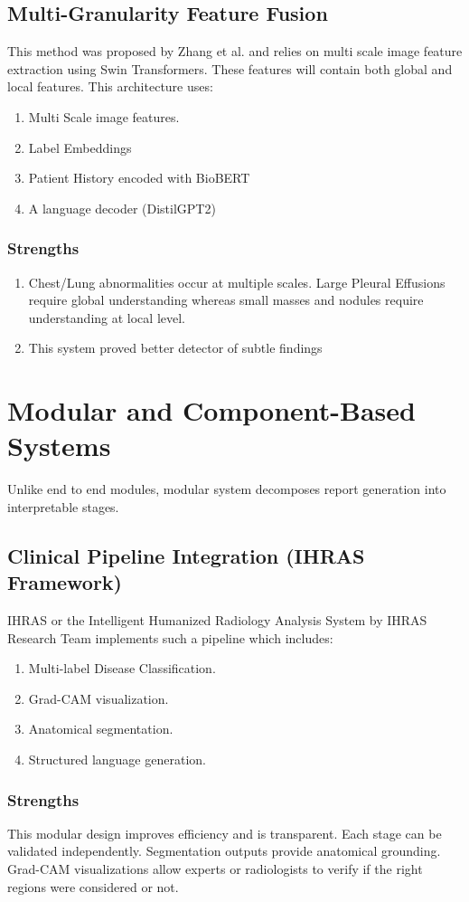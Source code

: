 \subsection{Multi-Granularity Feature Fusion}
This method was proposed by Zhang et al. and relies on multi scale image feature extraction using Swin Transformers. These features will contain both global and local features.
This architecture uses:
\begin{enumerate}
    \item Multi Scale image features.
    \item Label Embeddings
    \item Patient History encoded with BioBERT
    \item A language decoder (DistilGPT2)
\end{enumerate}
\subsubsection{Strengths}
\begin{enumerate}
    \item Chest/Lung abnormalities occur at multiple scales. Large Pleural Effusions require global understanding whereas small masses and nodules require understanding at local level.
    \item This system proved better detector of subtle findings 
\end{enumerate}
\section{Modular and Component-Based Systems}
Unlike end to end modules, modular system decomposes report generation into interpretable stages.
\subsection{Clinical Pipeline Integration (IHRAS Framework)}
IHRAS or the Intelligent Humanized Radiology Analysis System by IHRAS Research Team implements such a pipeline which includes:
\begin{enumerate}
    \item Multi-label Disease Classification.
    \item Grad-CAM visualization.
    \item Anatomical segmentation.
    \item Structured language generation.
    
\end{enumerate}
\subsubsection{Strengths}
This modular design improves efficiency and is transparent. Each stage can be validated independently. Segmentation outputs provide anatomical grounding. Grad-CAM visualizations allow experts or radiologists to verify if the right regions were considered or not.
